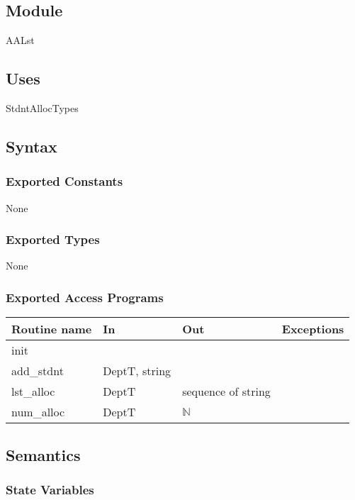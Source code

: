 \documentclass[12pt]{article}
\begin{document}
\subsection*{Module}

AALst

\subsection* {Uses}

StdntAllocTypes

\subsection* {Syntax}

\subsubsection* {Exported Constants}

None

\subsubsection* {Exported Types}

None

\subsubsection* {Exported Access Programs}

\begin{tabular}{| l | l | l | p{5cm} |}
\hline
\textbf{Routine name} & \textbf{In} & \textbf{Out} & \textbf{Exceptions}\\
\hline
init & ~ & ~ & ~\\
\hline
add\_stdnt & DeptT, string & ~ & ~\\
\hline
lst\_alloc & DeptT & sequence of string & ~\\
\hline
num\_alloc & DeptT & $\mathbb{N}$ & ~\\
\hline
\end{tabular}

\subsection* {Semantics}

\subsubsection* {State Variables}
\end{document}
